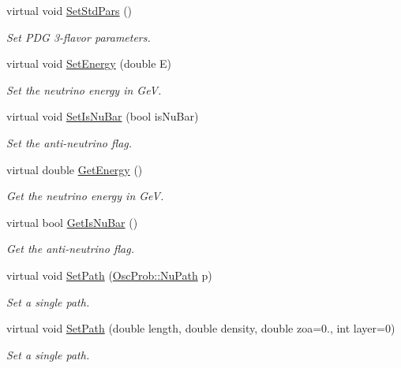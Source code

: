 \begin{DoxyCompactItemize}
virtual void \hyperlink{classOscProb_1_1PMNS__Base_a4de96ac9b6d1e9b029ab877e57d211ad}{Set\+Std\+Pars} ()
\begin{DoxyCompactList}\small\item\em Set P\+DG 3-\/flavor parameters. \end{DoxyCompactList}\item 
virtual void \hyperlink{classOscProb_1_1PMNS__Base_a95b3b0d0cab5e6a54b5ef99587f837c0}{Set\+Energy} (double E)
\begin{DoxyCompactList}\small\item\em Set the neutrino energy in GeV. \end{DoxyCompactList}\item 
virtual void \hyperlink{classOscProb_1_1PMNS__Base_a717e0348cf762f3961854e332a9b52e0}{Set\+Is\+Nu\+Bar} (bool is\+Nu\+Bar)
\begin{DoxyCompactList}\small\item\em Set the anti-\/neutrino flag. \end{DoxyCompactList}\item 
virtual double \hyperlink{classOscProb_1_1PMNS__Base_acc0d46cc4b8f911b40b807225003bbed}{Get\+Energy} ()
\begin{DoxyCompactList}\small\item\em Get the neutrino energy in GeV. \end{DoxyCompactList}\item 
virtual bool \hyperlink{classOscProb_1_1PMNS__Base_a2f7f2a028dfe7a90fff6b4f757972c2c}{Get\+Is\+Nu\+Bar} ()
\begin{DoxyCompactList}\small\item\em Get the anti-\/neutrino flag. \end{DoxyCompactList}\item 
virtual void \hyperlink{classOscProb_1_1PMNS__Base_ac3b644fd0a56347d304ceca4ae9d8875}{Set\+Path} (\hyperlink{structOscProb_1_1NuPath}{Osc\+Prob\+::\+Nu\+Path} p)
\begin{DoxyCompactList}\small\item\em Set a single path. \end{DoxyCompactList}\item 
virtual void \hyperlink{classOscProb_1_1PMNS__Base_a35b983270613072a3df58b574d80dbfd}{Set\+Path} (double length, double density, double zoa=0., int layer=0)
\begin{DoxyCompactList}\small\item\em Set a single path. \end{DoxyCompactList}\item 

\end{DoxyCompactItemize}
